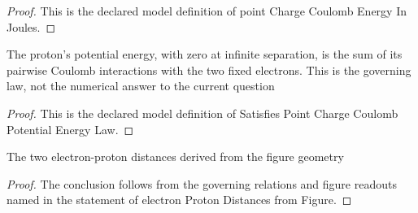 \begin{proof}
  This is the declared model definition of point Charge Coulomb Energy In Joules.
\end{proof}
\begin{definition}
  \label{def:physics:phyx-mini-0854:phyxminiproblems-problemphyxmini0854-satisfiespointchargecoulombpotentialenergylaw}
  The proton's potential energy, with zero at infinite separation, is the sum of its pairwise Coulomb interactions with the two fixed electrons. This is the governing law, not the numerical answer to the current question
\end{definition}
\begin{proof}
  This is the declared model definition of Satisfies Point Charge Coulomb Potential Energy Law.
\end{proof}
\begin{lemma}
  \label{lem:physics:phyx-mini-0854:phyxminiproblems-problemphyxmini0854-electronprotondistances-fromfigure}
  The two electron-proton distances derived from the figure geometry
\end{lemma}
\begin{proof}
  The conclusion follows from the governing relations and figure readouts named in the statement of electron Proton Distances from Figure.
\end{proof}
